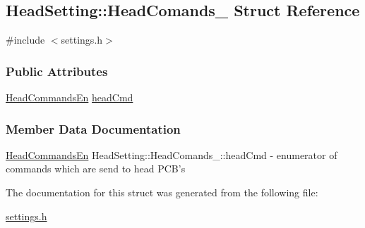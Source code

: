 \hypertarget{structHeadSetting_1_1HeadComands__}{}\subsection{Head\+Setting\+:\+:Head\+Comands\+\_\+ Struct Reference}
\label{structHeadSetting_1_1HeadComands__}


{\ttfamily \#include $<$settings.\+h$>$}

\subsubsection*{Public Attributes}
\begin{DoxyCompactItemize}
\item 
\mbox{\hyperlink{classHeadSetting_afe9523cb7fbbae2db026b1fca4a02be3}{Head\+Commands\+En}} \mbox{\hyperlink{structHeadSetting_1_1HeadComands___a7811619ec45cfc46a55b679f43e3aac3}{head\+Cmd}}
\end{DoxyCompactItemize}


\subsubsection{Member Data Documentation}
\mbox{\label{structHeadSetting_1_1HeadComands___a7811619ec45cfc46a55b679f43e3aac3}} 
{\footnotesize\ttfamily \mbox{\hyperlink{classHeadSetting_afe9523cb7fbbae2db026b1fca4a02be3}{Head\+Commands\+En}} Head\+Setting\+::\+Head\+Comands\+\_\+\+::\texorpdfstring{head\+Cmd}{headCmd}} - enumerator of commands which are send to head PCB's 



The documentation for this struct was generated from the following file\+:\begin{DoxyCompactItemize}
\item 
\mbox{\hyperlink{settings_8h}{settings.\+h}}\end{DoxyCompactItemize}
\newpage
